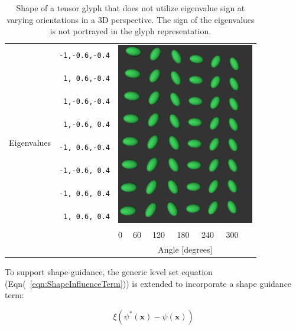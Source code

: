 \documentclass{InsightArticle}
\begin{document}
\begin{table}[ht]
  \begin{tabular}{cc p{0.01cm}p{0.4cm}p{0.5cm}p{0.5cm}p{0.5cm}p{0.5cm}p{0.5cm}}
    \hline
    \multirow{9}{*}{Eigenvalues}
    &\texttt{-1,-0.6,-0.4}&\multicolumn{7}{l}{\multirow{8}{*}{\includegraphics[width=6cm]{TensorGlyphMatrix}}} \\
    &\texttt{ 1, 0.6,-0.4}& & & & & & & \\
    &\texttt{ 1,-0.6,-0.4}& & & & & & & \\
    &\texttt{ 1,-0.6, 0.4}& & & & & & & \\
    &\texttt{-1, 0.6,-0.4}& & & & & & & \\
    &\texttt{-1,-0.6, 0.4}& & & & & & & \\
    &\texttt{-1, 0.6, 0.4}& & & & & & & \\
    &\texttt{ 1, 0.6, 0.4}& & & & & & & \\
    \hline
    \multicolumn{2}{c}{}& & 0 & 60 & 120 & 180 & 240 & 300 \\ [-1.1em]
    \multicolumn{2}{c}{}& \multicolumn{7}{c}{Angle [degrees]} \\
    \cline{3-9}
  \end{tabular}
  \caption{Shape of a tensor glyph that does not utilize eigenvalue sign at
    varying orientations in a 3D perspective. The sign of the eigenvalues is
    not portrayed in the glyph representation.}
  \label{tab:unsigned-flavors}
\end{table}


%
%


To support shape-guidance, the generic level set equation
(Eqn(~\ref{eqn:ShapeInfluenceTerm})) is extended to incorporate a shape guidance
term:

\begin{equation}
\label{eqn:ShapeInfluenceTerm}
\xi \left(\psi^{*}(\mathbf{x}) - \psi(\mathbf{x})\right)
\end{equation}




%
%



\end{document}
